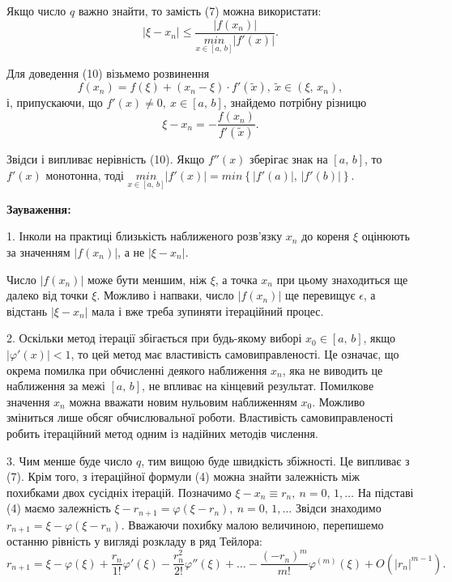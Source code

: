 \documentclass[14pt,a4paper,titlepage]{extarticle}
\begin{document}
Якщо число $q$ важно знайти, то замість (7) можна використати:
\begin{equation} 
\left|\xi-x_n\right|\leqslant\frac{\left|f(x_n)\right|}{\underset{x\in [a,\, b]}{min}\left|f'(x)\right|}.
\end{equation}

Для доведення (10) візьмемо розвинення 
$$f(x_n)=f(\xi)+(x_n-\xi)\cdot f'(\tilde{x}),\ \tilde{x}\in(\xi,\,x_n),$$
і, припускаючи, що $f'(x)\neq0,\ x\in[a,\, b]$, знайдемо потрібну різницю
$$
\xi-x_n=-\frac{f(x_n)}{f'(\tilde{x})}.
$$

Звідси і випливає нерівність (10). Якщо $f''(x)$ зберігає знак на $[a,\, b]$, то $f'(x)$ монотонна, тоді $\underset{x\in [a,\, b]}{min}\left|f'(x)\right|=min\left\{\left|f'(a)\right|,\,\left|f'(b)\right|\right\}$.

{\bf Зауваження:}

1. Інколи на практиці близькість наближеного розв'язку $x_n$ до кореня $\xi$ оцінюють за значенням $\left|f(x_n)\right|$, а не $\left|\xi-x_n\right|$.

Число $\left|f(x_n)\right|$ може бути меншим, ніж $\xi$, а точка $x_n$ при цьому знаходиться ще далеко від точки $\xi$. Можливо і напваки, число $\left|f(x_n)\right|$ ще перевищує $\epsilon$, а відстань $\left|\xi-x_n\right|$ мала і вже треба зупиняти ітераційний процес.

2. Оскільки метод ітерації збігається при будь-якому виборі $x_0\in[a,\, b]$, якщо $\left|\varphi'(x)\right|<1$, то цей метод має властивість самовиправленості. Це означає, що окрема помилка при обчисленні деякого наближення $x_n$, яка не виводить це наближення за межі $[a,\, b]$, не впливає на кінцевий результат. Помилкове значення $x_n$ можна вважати новим нульовим наближенням $x_0$. Можливо зміниться лише обсяг обчислювальної роботи. Властивість самовиправленості робить ітераційний метод одним із надійних методів числення.

3. Чим менше буде число $q$, тим вищою буде швидкість збіжності. Це випливає з (7). Крім того, з ітераційної формули (4) можна знайти залежність між похибками двох сусідніх ітерацій. Позначимо $\xi-x_n\equiv r_n,\ n=0,\,1,\ldots$ На підставі (4) маємо залежність $\xi-r_{n+1}=\varphi(\xi-r_n),\ n=0,\,1,\ldots$ Звідси знаходимо $r_{n+1}=\xi-\varphi(\xi-r_n)$. Вважаючи похибку малою величиною, перепишемо останню рівність у вигляді розкладу в ряд Тейлора:
$$r_{n+1}=\xi-\varphi(\xi)+\frac{r_n}{1!}\varphi'(\xi)-\frac{r_n^2}{2!}\varphi''(\xi)+\ldots-\frac{(-r_n)^m}{m!}\varphi^{(m)}(\xi)+O\left(\left|r_n\right|^{m-1}\right).$$
\end{document}

